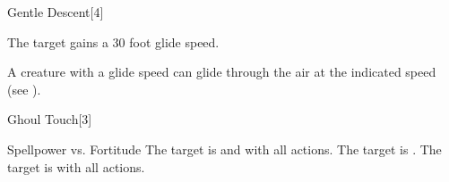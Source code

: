 \begin{spellsection}[Mass]{Gentle Descent}[4]
    \begin{spellheader}
    \end{spellheader}
    \begin{spellcontent}
        \begin{spelltargetinginfo}
        \end{spelltargetinginfo}
        \begin{spelleffects}
            \spelleffect The target gains a 30 foot glide speed.
            \spelldur \durshort
        \end{spelleffects}
    \end{spellcontent}
    \begin{spellfooter}
        \spellnotes A creature with a glide speed can glide through the air at the indicated speed (see ).
        \miscastexplode
    \end{spellfooter}
\end{spellsection}

\begin{spellsection}{Ghoul Touch}[3]
    \begin{spellheader}
    \end{spellheader}
    \begin{spellcontent}
        \begin{spelltargetinginfo}
        \end{spelltargetinginfo}
        \begin{spelleffects}
            \begin{spellattack}{Spellpower vs. Fortitude}
                \spellsuccess The target is \staggered and \impaired with all actions.
                \spellcritical The target is \paralyzed.
                \spellfailure The target is \impaired with all actions.
            \end{spellattack}
            \spelldur \durbrief
        \end{spelleffects}
    \end{spellcontent}
    \begin{spellfooter}
        \miscastrandom
    \end{spellfooter}
\end{spellsection}

